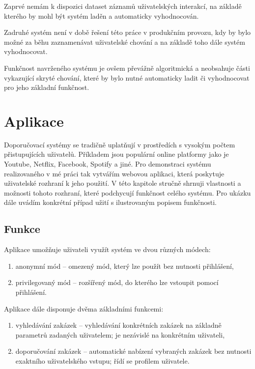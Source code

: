 \documentclass[thesis=M,czech]{FITthesis}[2019/12/23]
\begin{document}
Zaprvé nemám k dispozici dataset záznamů uživatelských interakcí, na základě kterého by mohl být systém laděn a automaticky vyhodnocován.

Zadruhé systém není v době řešení této práce v produkčním provozu, kdy by bylo možné za běhu zaznamenávat uživatelské chování a na základě toho dále systém vyhodnocovat.

Funkčnost navrženého systému je ovšem převážně algoritmická a neobsahuje části vykazující skryté chování, které by bylo nutné automaticky ladit či vyhodnocovat pro jeho základní funkčnost.


\chapter{Aplikace}

Doporučovací systémy se tradičně uplatňují v prostředích s vysokým počtem přistupujících uživatelů. Příkladem jsou populární online platformy jako je Youtube, Netflix, Facebook, Spotify a jiné. Pro demonstraci systému realizovaného v mé práci tak vytvářím webovou aplikaci, která poskytuje uživatelské rozhraní k jeho použití. V této kapitole stručně shrnuji vlastnosti a možnosti tohoto rozhraní, které podchycují funkčnost celého systému. Pro ukázku dále uvádím konkrétní případ užití s ilustrovaným popisem funkčnosti.
\newpage

\section{Funkce}

Aplikace umožňuje uživateli využít systém ve dvou různých módech:
\begin{enumerate}
    \item anonymní mód -- omezený mód, který lze použít bez nutnosti přihlášení,
    \item privilegovaný mód -- rozšířený mód, do kterého lze vstoupit pomocí přihlášení.
\end{enumerate}

Aplikace dále disponuje dvěma základními funkcemi:
\begin{enumerate}
    \item vyhledávání zakázek -- vyhledávání konkrétních zakázek na základně parametrů zadaných uživatelem; je nezávislé na konkrétním uživateli,
    \item doporučování zakázek -- automatické nabízení vybraných zakázek bez nutnosti exaktního uživatelského vstupu; řídí se profilem uživatele.
\end{enumerate}
\end{document}
